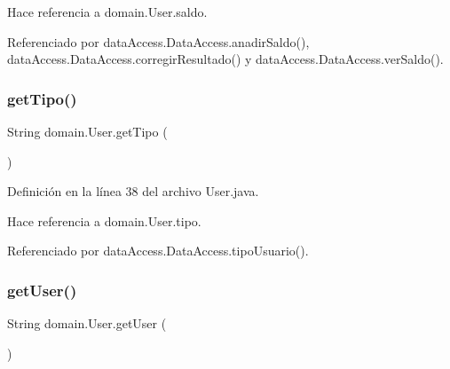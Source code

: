\begin{DoxyCode}{0}

\end{DoxyCode}


Hace referencia a domain.\+User.\+saldo.



Referenciado por data\+Access.\+Data\+Access.\+anadir\+Saldo(), data\+Access.\+Data\+Access.\+corregir\+Resultado() y data\+Access.\+Data\+Access.\+ver\+Saldo().

\mbox{\label{classdomain_1_1User_a38873ecd67b4dccdf3bb067df7d9eb06}} 
\subsubsection{\texorpdfstring{getTipo()}{getTipo()}}
{\footnotesize\ttfamily String domain.\+User.\+get\+Tipo (\begin{DoxyParamCaption}{ }\end{DoxyParamCaption})}



Definición en la línea 38 del archivo User.\+java.


\begin{DoxyCode}{0}

\end{DoxyCode}


Hace referencia a domain.\+User.\+tipo.



Referenciado por data\+Access.\+Data\+Access.\+tipo\+Usuario().

\mbox{\label{classdomain_1_1User_a1d9197078569283ae7410f9af2d8d013}} 
\subsubsection{\texorpdfstring{getUser()}{getUser()}}
{\footnotesize\ttfamily String domain.\+User.\+get\+User (\begin{DoxyParamCaption}{ }\end{DoxyParamCaption})}



